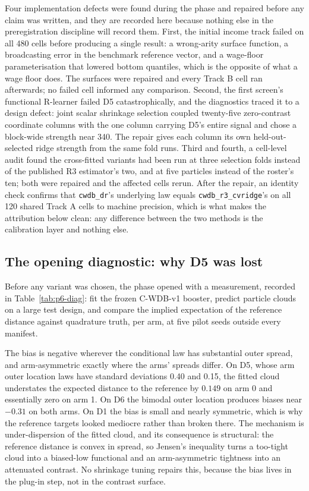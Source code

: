 Four implementation defects were found during the phase and repaired before
any claim was written, and they are recorded here because nothing else in the
preregistration discipline will record them. First, the initial income track
failed on all 480 cells before producing a single result: a wrong-arity
surface function, a broadcasting error in the benchmark reference vector, and
a wage-floor parameterisation that lowered bottom quantiles, which is the
opposite of what a wage floor does. The surfaces were repaired and every Track
B cell ran afterwards; no failed cell informed any comparison. Second, the
first screen's functional R-learner failed D5 catastrophically, and the
diagnostics traced it to a design defect: joint scalar shrinkage selection
coupled twenty-five zero-contrast coordinate columns with the one column
carrying D5's entire signal and chose a block-wide strength near 340. The
repair gives each column its own held-out-selected ridge strength from the
same fold runs. Third and fourth, a cell-level audit found the cross-fitted
variants had been run at three selection folds instead of the published R3
estimator's two, and at five particles instead of the roster's ten; both were
repaired and the affected cells rerun. After the repair, an identity check
confirms that \texttt{cwdb\_dr}'s underlying law equals
\texttt{cwdb\_r3\_cvridge}'s on all 120 shared Track A cells to machine
precision, which is what makes the attribution below clean: any difference
between the two methods is the calibration layer and nothing else.

\subsection{The opening diagnostic: why D5 was lost}
\label{sub:p6-diag}

Before any variant was chosen, the phase opened with a measurement, recorded
in Table~\ref{tab:p6-diag}: fit the frozen C-WDB-v1 booster, predict particle
clouds on a large test design, and compare the implied expectation of the
reference distance against quadrature truth, per arm, at five pilot seeds
outside every manifest.

The bias is negative wherever the conditional law has substantial outer
spread, and arm-asymmetric exactly where the arms' spreads differ. On D5,
whose arm outer location laws have standard deviations 0.40 and 0.15, the
fitted cloud understates the expected distance to the reference by $0.149$ on
arm 0 and essentially zero on arm 1. On D6 the bimodal outer location produces
biases near $-0.31$ on both arms. On D1 the bias is small and nearly
symmetric, which is why the reference targets looked mediocre rather than
broken there. The mechanism is under-dispersion of the fitted cloud, and its
consequence is structural: the reference distance is convex in spread, so
Jensen's inequality turns a too-tight cloud into a biased-low functional and
an arm-asymmetric tightness into an attenuated contrast. No shrinkage tuning
repairs this, because the bias lives in the plug-in step, not in the contrast
surface.

